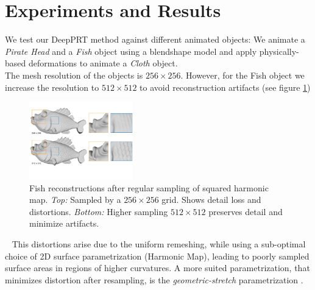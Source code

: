 \section{Experiments and Results}  \label{Sec:Experiments}
We test our DeepPRT method against different animated objects: We animate a \textit{Pirate Head} and a \textit{Fish} object using a blendshape model and apply physically-based deformations to animate a \textit{Cloth} object.
\\
The mesh resolution of the objects is $256 \times 256$. However, for the Fish object we increase the resolution to $512 \times 512$ to avoid reconstruction artifacts (see figure \ref{Fig: Fish Reconstruction})
\begin{figure}[H]
  \centering
    \includegraphics[width=0.4\textwidth]{Figures/fish}
     \caption{Fish reconstructions after regular sampling of squared harmonic map. \textit{Top:} Sampled by a $256 \times 256$ grid. Shows detail loss and distortions. \textit{Bottom:} Higher sampling $512 \times 512$ preserves detail and minimize artifacts.}
     \label{Fig: Fish Reconstruction}
\end{figure}~
This distortions arise due to the uniform remeshing, while using a sub-optimal choice of 2D surface parametrization (Harmonic Map), leading to poorly sampled surface areas in regions of higher curvatures. A more suited parametrization, that minimizes distortion after resampling, is the \textit{geometric-stretch} parametrization  \cite{gu2002geometry}.
